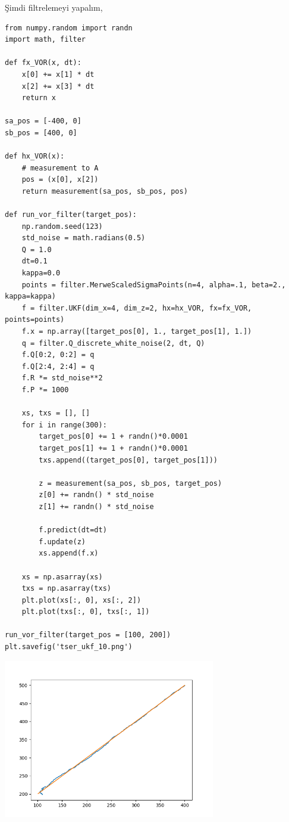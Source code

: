 \documentclass[12pt,fleqn]{article}\usepackage{../../common}
\begin{document}
Şimdi filtrelemeyi yapalım,

\begin{verbatim}
from numpy.random import randn
import math, filter

def fx_VOR(x, dt):
    x[0] += x[1] * dt
    x[2] += x[3] * dt
    return x

sa_pos = [-400, 0]
sb_pos = [400, 0]

def hx_VOR(x):
    # measurement to A
    pos = (x[0], x[2])
    return measurement(sa_pos, sb_pos, pos)

def run_vor_filter(target_pos):
    np.random.seed(123)
    std_noise = math.radians(0.5)
    Q = 1.0
    dt=0.1
    kappa=0.0
    points = filter.MerweScaledSigmaPoints(n=4, alpha=.1, beta=2., kappa=kappa)
    f = filter.UKF(dim_x=4, dim_z=2, hx=hx_VOR, fx=fx_VOR, points=points)
    f.x = np.array([target_pos[0], 1., target_pos[1], 1.])
    q = filter.Q_discrete_white_noise(2, dt, Q)
    f.Q[0:2, 0:2] = q
    f.Q[2:4, 2:4] = q
    f.R *= std_noise**2
    f.P *= 1000    

    xs, txs = [], []
    for i in range(300):
        target_pos[0] += 1 + randn()*0.0001
        target_pos[1] += 1 + randn()*0.0001
        txs.append((target_pos[0], target_pos[1]))

        z = measurement(sa_pos, sb_pos, target_pos)
        z[0] += randn() * std_noise
        z[1] += randn() * std_noise

        f.predict(dt=dt)
        f.update(z)
        xs.append(f.x)

    xs = np.asarray(xs)
    txs = np.asarray(txs)
    plt.plot(xs[:, 0], xs[:, 2])
    plt.plot(txs[:, 0], txs[:, 1])

run_vor_filter(target_pos = [100, 200])
plt.savefig('tser_ukf_10.png')
\end{verbatim}

\includegraphics[width=25em]{tser_ukf_10.png}
\end{document}
